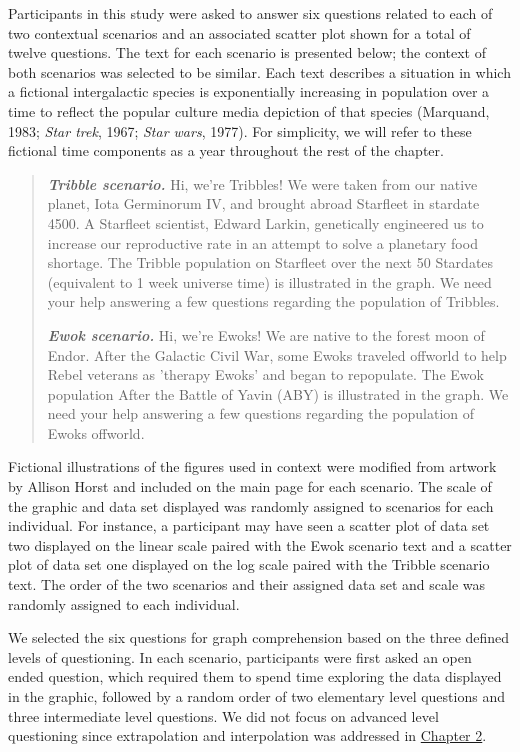 \documentclass[print]{nuthesis}
\begin{document}
Participants in this study were asked to answer six questions related to each of two contextual scenarios and an associated scatter plot shown for a total of twelve questions.
The text for each scenario is presented below; the context of both scenarios was selected to be similar.
Each text describes a situation in which a fictional intergalactic species is exponentially increasing in population over a time  to reflect the popular culture media depiction of that species (Marquand, 1983; \emph{Star trek}, 1967; \emph{Star wars}, 1977).
For simplicity, we will refer to these fictional time components as a year throughout the rest of the chapter.

\begin{quote}
\textbf{\textit{Tribble scenario.}} Hi, we're Tribbles! We were taken from our native planet, Iota Germinorum IV, and brought abroad Starfleet in stardate 4500. A Starfleet scientist, Edward Larkin, genetically engineered us to increase our reproductive rate in an attempt to solve a planetary food shortage. The Tribble population on Starfleet over the next 50 Stardates (equivalent to 1 week universe time) is illustrated in the graph. We need your help answering a few questions regarding the population of Tribbles.

\textbf{\textit{Ewok scenario.}} Hi, we're Ewoks! We are native to the forest moon of Endor. After the Galactic Civil War, some Ewoks traveled offworld to help Rebel veterans as 'therapy Ewoks' and began to repopulate. The Ewok population After the Battle of Yavin (ABY) is illustrated in the graph. We need your help answering a few questions regarding the population of Ewoks offworld.
\end{quote}

Fictional illustrations of the figures used in context were modified from artwork by Allison Horst and included on the main page for each scenario.
The scale of the graphic and data set displayed was randomly assigned to scenarios for each individual.
For instance, a participant may have seen a scatter plot of data set two displayed on the linear scale paired with the Ewok scenario text and a scatter plot of data set one displayed on the log scale paired with the Tribble scenario text.
The order of the two scenarios and their assigned data set and scale was randomly assigned to each individual.

We selected the six questions  for graph comprehension based on the three defined levels of questioning.
In each scenario, participants were first asked an open ended question, which required them to spend time exploring the data displayed in the graphic, followed by a random order of two elementary level questions and three intermediate level questions.
We did not focus on advanced level questioning since extrapolation and interpolation was addressed in \protect\hyperlink{youdrawit}{Chapter 2}.
\end{document}
